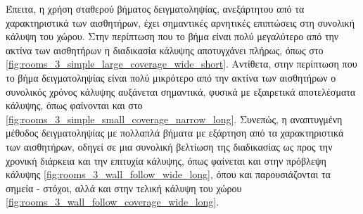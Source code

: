 Έπειτα, η χρήση σταθερού βήματος δειγματοληψίας, ανεξάρτητου από τα χαρακτηριστικά των αισθητήρων, έχει σημαντικές αρνητικές επιπτώσεις στη συνολική κάλυψη του χώρου. Στην περίπτωση που το βήμα είναι πολύ μεγαλύτερο από την ακτίνα των αισθητήρων η διαδικασία κάλυψης αποτυγχάνει πλήρως, όπως στο \autoref{fig:rooms_3_simple_large_coverage_wide_short}. Αντίθετα, στην περίπτωση που το βήμα δειγματοληψίας είναι πολύ μικρότερο από την ακτίνα των αισθητήρων ο συνολικός χρόνος κάλυψης αυξάνεται σημαντικά, φυσικά με εξαιρετικά αποτελέσματα κάλυψης, όπως φαίνονται και στο \autoref{fig:rooms_3_simple_small_coverage_narrow_long}. Συνεπώς, η αναπτυγμένη μέθοδος δειγματοληψίας με πολλαπλά βήματα με εξάρτηση από τα χαρακτηριστικά των αισθητήρων, οδηγεί σε μια συνολική βελτίωση της διαδικασίας ως προς την χρονική διάρκεια και την επιτυχία κάλυψης, όπως φαίνεται και στην πρόβλεψη κάλυψης \ref{fig:rooms_3_wall_follow_wide_long}, όπου και παρουσιάζονται τα σημεία - στόχοι, αλλά και στην τελική κάλυψη του χώρου \ref{fig:rooms_3_wall_follow_coverage_wide_long}. 



